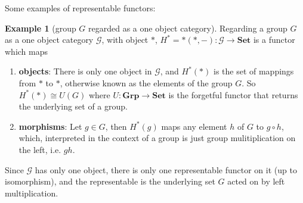 \documentclass[11pt]{article}
\theoremstyle{definition}
\theoremstyle{definition}
\newtheorem{ex}{Example}
\theoremstyle{plain}
\theoremstyle{plain}
\theoremstyle{plain}
\begin{document}
Some examples of representable functors:

\begin{ex}[group $G$ regarded as a one object category]
Regarding a group $G$ as a one object category $\mathscr{G}$, with object $\ast$, $H^{\ast}=\ast(\ast, -): \mathscr{G} \to \textbf{Set}$ is a functor which maps
\begin{enumerate}
\item \textbf{objects}: There is only one object in $\mathscr{G}$, and $H^{\ast}(\ast)$ is the set of mappings from $\ast$ to $\ast$, otherwise known as the elements of the group $G$. So $H^{\ast}(\ast) \cong U(G)$ where $U:\textbf{Grp} \to \textbf{Set}$ is the forgetful functor that returns the underlying set of a group.
\item \textbf{morphisms}: Let $g \in G$, then $H^{\ast}(g)$ maps any element $h$ of $G$ to $g \circ h$, which, interpreted in the context of a group is just group mulitiplication on the left, i.e. $gh$.
\end{enumerate}

Since $\mathscr{G}$ has only one object, there is only one representable functor on it (up to isomorphism), and the representable is the underlying set $G$ acted on by left multiplication.
\end{ex}
\end{document}
